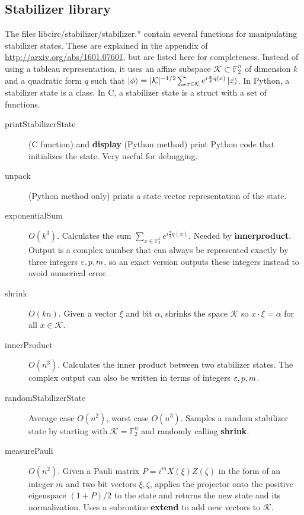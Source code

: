 \documentclass[11pt]{article}
\begin{document}
\subsection{Stabilizer library}

The files libcirc/stabilizer/stabilizer.* contain several functions for manipulating stabilizer states. These are explained in the appendix of \url{http://arxiv.org/abs/1601.07601}, but are listed here for completeness. Instead of using a tableau representation, it uses an affine subspace $\mathcal{K} \subset \mathbb{F}^{n}_2$ of dimension $k$ and a quadratic form $q$ such that $\ket{\phi} = |\mathcal{K}|^{-1/2}\sum_{x \in \mathcal{K}}e^{i \frac{\pi}{4}q(x)} \ket{x}$. In Python, a stabilizer state is a class. In C, a stabilizer state is a struct with a set of functions.

\begin{description}
    \item[printStabilizerState] (C function) and \textbf{display} (Python method) print Python code that initializes the state. Very useful for debugging.
    \item[unpack] (Python method only) prints a state vector representation of the state.
    \item[exponentialSum] $O(k^3)$. Calculates the sum $\sum_{x \in \mathbb{F}^k_2} e^{i\frac{\pi}{4}q(x)}$. Needed by \textbf{innerproduct}. Output is a complex number that can always be represented exactly by three integers $\varepsilon, p, m$, so an exact version outputs these integers instead to avoid numerical error.
    \item[shrink] $O(kn)$. Given a vector $\xi$ and bit $\alpha$, shrinks the space $\mathcal{K}$ so $x \cdot \xi = \alpha$ for all $x \in \mathcal{K}$.
    \item[innerProduct] $O(n^3)$. Calculates the inner product between two stabilizer states. The complex output can also be written in terms of integers $\varepsilon,p,m$.
    \item[randomStabilizerState] Average case $O(n^2)$, worst case $O(n^3)$. Samples a random stabilizer state by starting with $\mathcal{K} = \mathbb{F}^n_2$ and randomly calling \textbf{shrink}.
    \item[measurePauli] $O(n^2)$. Given a Pauli matrix $P = i^m X(\xi)Z(\zeta)$ in the form of an integer $m$ and two bit vectors $\xi,\zeta$, applies the projector onto the positive eigenspace $(1+P)/2$ to the state and returns the new state and its normalization. Uses a subroutine \textbf{extend} to add new vectors to $\mathcal{K}$.

\end{description}
\end{document}
